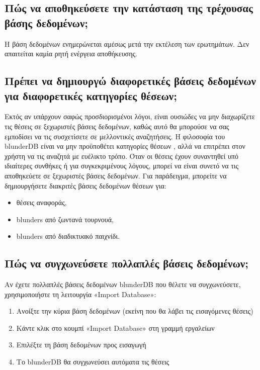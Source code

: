 \documentclass[letterpaper,10pt,greek]{sphinxmanual}
\begin{document}
\subsection{Πώς να αποθηκεύσετε την κατάσταση της τρέχουσας βάσης δεδομένων;}
\label{\detokenize{faq:comment-sauvegarder-la-base-de-donnees-courante}}
\sphinxAtStartPar
Η βάση δεδομένων ενημερώνεται αμέσως μετά την εκτέλεση των ερωτημάτων. Δεν απαιτείται καμία ρητή ενέργεια αποθήκευσης.


\subsection{Πρέπει να δημιουργώ διαφορετικές βάσεις δεδομένων για διαφορετικές κατηγορίες θέσεων;}
\label{\detokenize{faq:dois-je-creer-differentes-bases-de-donnees-pour-differentes-categories-de-positions}}
\sphinxAtStartPar
Εκτός αν υπάρχουν σαφώς προσδιορισμένοι λόγοι, είναι ουσιώδες να μην διαχωρίζετε τις θέσεις σε ξεχωριστές βάσεις δεδομένων, καθώς αυτό θα μπορούσε να σας εμποδίσει να τις συσχετίσετε σε μελλοντικές αναζητήσεις. Η φιλοσοφία του blunderDB είναι να μην προϋποθέτει κατηγορίες θέσεων , αλλά να επιτρέπει στον χρήστη να τις αναζητά με ευέλικτο τρόπο. Όταν οι θέσεις έχουν συναντηθεί υπό ιδιαίτερες συνθήκες ή για συγκεκριμένους λόγους, μπορεί να είναι συνετό να τις αποθηκεύετε σε ξεχωριστές βάσεις δεδομένων. Για παράδειγμα, μπορείτε να δημιουργήσετε διακριτές βάσεις δεδομένων θέσεων για:
\begin{itemize}
\item {} 
\sphinxAtStartPar
θέσεις αναφοράς,

\item {} 
\sphinxAtStartPar
blunders από ζωντανά τουρνουά,

\item {} 
\sphinxAtStartPar
blunders από διαδικτυακό παιχνίδι.

\end{itemize}


\subsection{Πώς να συγχωνεύσετε πολλαπλές βάσεις δεδομένων;}
\label{\detokenize{faq:comment-fusionner-plusieurs-bases-de-donnees}}
\sphinxAtStartPar
Αν έχετε πολλαπλές βάσεις δεδομένων blunderDB που θέλετε να συγχωνεύσετε, χρησιμοποιήστε τη λειτουργία «Import Database»:
\begin{enumerate}
%
\item {} 
\sphinxAtStartPar
Ανοίξτε την κύρια βάση δεδομένων (εκείνη που θα λάβει τις εισαγόμενες θέσεις)

\item {} 
\sphinxAtStartPar
Κάντε κλικ στο κουμπί «Import Database» στη γραμμή εργαλείων

\item {} 
\sphinxAtStartPar
Επιλέξτε τη βάση δεδομένων προς εισαγωγή

\item {} 
\sphinxAtStartPar
Το blunderDB θα συγχωνεύσει αυτόματα τις θέσεις

\end{enumerate}
\end{document}
